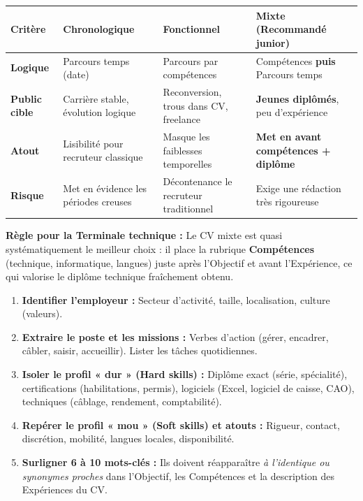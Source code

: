 \documentclass[11pt]{article}
\newcommand{\cle}[1]{{\popxbold\color{popdark}#1}}
\begin{document}
\begin{exemplebox}
\begin{center}
\begin{tabularx}{\linewidth}{|l|X|X|X|}\hline
\rowcolor{popblueL} \textbf{Critère} & \textbf{Chronologique} & \textbf{Fonctionnel} & \textbf{Mixte (Recommandé junior)} \\ \hline
\textbf{Logique} & Parcours temps (date) & Parcours par compétences & Compétences \textbf{puis} Parcours temps \\ \hline
\textbf{Public cible} & Carrière stable, évolution logique & Reconversion, trous dans CV, freelance & \textbf{Jeunes diplômés}, peu d'expérience \\ \hline
\textbf{Atout} & Lisibilité pour recruteur classique & Masque les faiblesses temporelles & \textbf{Met en avant compétences + diplôme} \\ \hline
\textbf{Risque} & Met en évidence les périodes creuses & Décontenance le recruteur traditionnel & Exige une rédaction très rigoureuse \\ \hline
\end{tabularx}
\end{center}
\textbf{Règle pour la Terminale technique :} Le \cle{CV mixte} est quasi systématiquement le meilleur choix : il place la rubrique \textbf{Compétences} (technique, informatique, langues) juste après l'Objectif et avant l'Expérience, ce qui valorise le diplôme technique fraîchement obtenu.
\end{exemplebox}

\begin{methode}
\begin{enumerate}
\item \textbf{Identifier l'employeur :} Secteur d'activité, taille, localisation, culture (valeurs).
\item \textbf{Extraire le poste et les missions :} Verbes d'action (gérer, encadrer, câbler, saisir, accueillir). Lister les tâches quotidiennes.
\item \textbf{Isoler le profil « dur » (Hard skills) :} Diplôme exact (série, spécialité), certifications (habilitations, permis), logiciels (Excel, logiciel de caisse, CAO), techniques (câblage, rendement, comptabilité).
\item \textbf{Repérer le profil « mou » (Soft skills) et atouts :} Rigueur, contact, discrétion, mobilité, langues locales, disponibilité.
\item \textbf{Surligner 6 à 10 \cle{mots-clés} :} Ils doivent réapparaître \emph{à l'identique ou synonymes proches} dans l'Objectif, les Compétences et la description des Expériences du CV.
\end{enumerate}
\end{methode}
\end{document}
